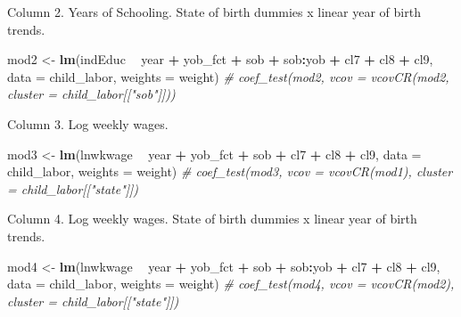 \documentclass[]{book}
\newenvironment{Shaded}{\begin{snugshade}}{\end{snugshade}}
\newcommand{\KeywordTok}[1]{\textcolor[rgb]{0.13,0.29,0.53}{\textbf{#1}}}
\newcommand{\DataTypeTok}[1]{\textcolor[rgb]{0.13,0.29,0.53}{#1}}
\newcommand{\StringTok}[1]{\textcolor[rgb]{0.31,0.60,0.02}{#1}}
\newcommand{\CommentTok}[1]{\textcolor[rgb]{0.56,0.35,0.01}{\textit{#1}}}
\newcommand{\OperatorTok}[1]{\textcolor[rgb]{0.81,0.36,0.00}{\textbf{#1}}}
\newcommand{\NormalTok}[1]{#1}
\theoremstyle{definition}
\theoremstyle{definition}
\theoremstyle{definition}
\theoremstyle{remark}
\begin{document}
Column 2. Years of Schooling. State of birth dummies x linear year of
birth trends.

\begin{Shaded}
\begin{Highlighting}[]
\NormalTok{mod2 <-}\StringTok{ }\KeywordTok{lm}\NormalTok{(indEduc }\OperatorTok{~}\StringTok{ }\NormalTok{year }\OperatorTok{+}\StringTok{ }\NormalTok{yob_fct }\OperatorTok{+}\StringTok{ }\NormalTok{sob }\OperatorTok{+}\StringTok{ }\NormalTok{sob}\OperatorTok{:}\NormalTok{yob }\OperatorTok{+}\StringTok{ }\NormalTok{cl7 }\OperatorTok{+}\StringTok{ }\NormalTok{cl8 }\OperatorTok{+}\StringTok{ }\NormalTok{cl9,}
           \DataTypeTok{data =}\NormalTok{ child_labor, }\DataTypeTok{weights =}\NormalTok{ weight)}
\CommentTok{# coef_test(mod2, vcov = vcovCR(mod2, cluster = child_labor[["sob"]]))}
\end{Highlighting}
\end{Shaded}

Column 3. Log weekly wages.

\begin{Shaded}
\begin{Highlighting}[]
\NormalTok{mod3 <-}\StringTok{ }\KeywordTok{lm}\NormalTok{(lnwkwage }\OperatorTok{~}\StringTok{ }\NormalTok{year }\OperatorTok{+}\StringTok{ }\NormalTok{yob_fct }\OperatorTok{+}\StringTok{ }\NormalTok{sob }\OperatorTok{+}\StringTok{ }\NormalTok{cl7 }\OperatorTok{+}\StringTok{ }\NormalTok{cl8 }\OperatorTok{+}\StringTok{ }\NormalTok{cl9,}
           \DataTypeTok{data =}\NormalTok{ child_labor, }\DataTypeTok{weights =}\NormalTok{ weight)}
\CommentTok{# coef_test(mod3, vcov = vcovCR(mod1), cluster = child_labor[["state"]])}
\end{Highlighting}
\end{Shaded}

Column 4. Log weekly wages. State of birth dummies x linear year of
birth trends.

\begin{Shaded}
\begin{Highlighting}[]
\NormalTok{mod4 <-}\StringTok{ }\KeywordTok{lm}\NormalTok{(lnwkwage }\OperatorTok{~}\StringTok{ }\NormalTok{year }\OperatorTok{+}\StringTok{ }\NormalTok{yob_fct }\OperatorTok{+}\StringTok{ }\NormalTok{sob }\OperatorTok{+}\StringTok{ }\NormalTok{sob}\OperatorTok{:}\NormalTok{yob }\OperatorTok{+}\StringTok{ }\NormalTok{cl7 }\OperatorTok{+}\StringTok{ }\NormalTok{cl8 }\OperatorTok{+}\StringTok{ }\NormalTok{cl9,}
           \DataTypeTok{data =}\NormalTok{ child_labor, }\DataTypeTok{weights =}\NormalTok{ weight)}
\CommentTok{# coef_test(mod4, vcov = vcovCR(mod2), cluster = child_labor[["state"]])}
\end{Highlighting}
\end{Shaded}
\end{document}
